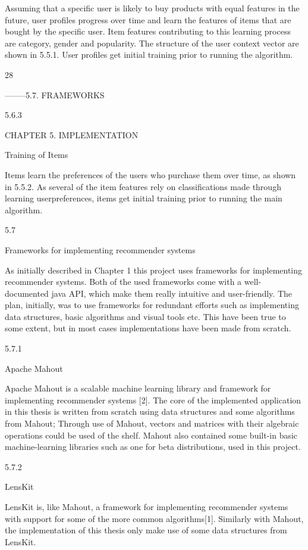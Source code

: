 Assuming that a specific user is likely to buy products with equal features in the future,
user profiles progress over time and learn the features of items that are bought by the
specific user. Item features contributing to this learning process are category, gender and
popularity. The structure of the user context vector are shown in 5.5.1. User profiles get
initial training prior to running the algorithm.

28

--------5.7. FRAMEWORKS

5.6.3

CHAPTER 5. IMPLEMENTATION

Training of Items

Items learn the preferences of the users who purchase them over time, as shown in
5.5.2. As several of the item features rely on classifications made through learning userpreferences, items get initial training prior to running the main algorithm.

5.7

Frameworks for implementing recommender systems

As initially described in Chapter 1 this project uses frameworks for implementing recommender systems. Both of the used frameworks come with a well-documented java API,
which make them really intuitive and user-friendly. The plan, initially, was to use frameworks for redundant efforts such as implementing data structures, basic algorithms and
visual tools etc. This have been true to some extent, but in most cases implementations
have been made from scratch.

5.7.1

Apache Mahout

Apache Mahout is a scalable machine learning library and framework for implementing
recommender systems [2]. The core of the implemented application in this thesis is
written from scratch using data structures and some algorithms from Mahout; Through
use of Mahout, vectors and matrices with their algebraic operations could be used of the
shelf. Mahout also contained some built-in basic machine-learning libraries such as one
for beta distributions, used in this project.

5.7.2

LensKit

LensKit is, like Mahout, a framework for implementing recommender systems with support for some of the more common algorithms[1]. Similarly with Mahout, the implementation of this thesis only make use of some data structures from LensKit.

